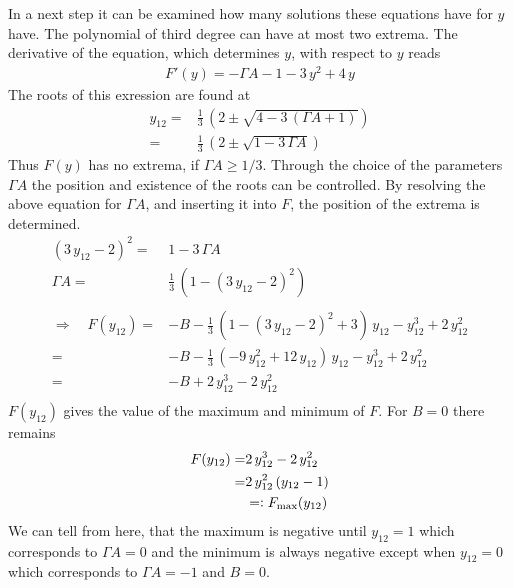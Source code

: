 \documentclass{article}
\begin{document}
In a next step it can be examined how many solutions these equations have for ${y}$ have. The polynomial of third degree can have at most two extrema. The derivative of the equation, which determines $y$, with respect to $y$ reads
\begin{align*}
    F'(y)=-\Gamma A-1 -3\,y^2+4\,y
\end{align*}
The roots of this exression are found at
\begin{align*}
    y_{12}=&\frac{1}{3}\,\left(  2\pm \sqrt{4-3\,(\Gamma A+1)}  \right)\\
    =&\frac{1}{3}\,\left(  2\pm \sqrt{1-3\,\Gamma A}  \right)
\end{align*}
Thus $F(y)$ has no extrema, if $\Gamma A\geq1/3$. Through the choice of the parameters $\Gamma A$ the position and existence of the roots can be controlled. By resolving the above equation for $\Gamma A$, and inserting it into $F$, the position of the extrema is determined.
\begin{align*}
    (3\,y_{12}-2)^2=&1-3\,\Gamma A\\
    \Gamma A=& \frac{1}{3}\,\left(  1-(3\,y_{12}-2)^2 \right)\\\\
    \Rightarrow\quad F(y_{12})=&-B-\frac{1}{3}\,\left(  1-(3\,y_{12}-2)^2 +3\right)\,y_{12}-y_{12}^3+2\,y_{12}^2\\
    =&-B-\frac{1}{3}\,\left( - 9\,y_{12}^2+12\,y_{12}\right)\,y_{12}-y_{12}^3+2\,y_{12}^2\\
    =&-B+2\,y_{12}^3-2\,y_{12}^2\\
\end{align*}
$F(y_{12})$ gives the value of the maximum and minimum of $F$. For $B=0$ there remains
\begin{align*}
    F(y_{12})=&2\,y_{12}^3-2\,y_{12}^2\\
    =&2\,y_{12}^2\,(y_{12}-1)\\
    &=\vcentcolon F_\text{max}(y_{12})
\end{align*}
We can tell from here, that the maximum is negative until $y_{12}=1$ which corresponds to $\Gamma A =0$ and the minimum is always negative except when $y_{12}=0$ which corresponds to $\Gamma A=-1$ and $B=0$. \\
\end{document}
